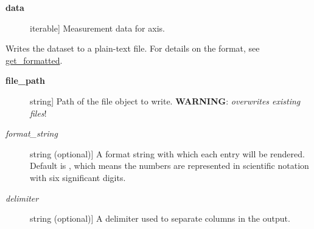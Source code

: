 \documentclass[a4paper,10pt,english]{sphinxmanual}
\begin{document}
\begin{fulllineitems}
\begin{fulllineitems}
\begin{description}
\item[{\textbf{data}}] \leavevmode{[}iterable{]}
Measurement data for axis.

\end{description}

\end{fulllineitems}


\begin{fulllineitems}
\label{index:kafe.dataset.Dataset.write_formatted}
Writes the dataset to a plain-text file. For details on the format, see {\hyperref[index:get-formatted]{get\_formatted}}.
\begin{description}
\item[{\textbf{file\_path}}] \leavevmode{[}string{]}
Path of the file object to write. \textbf{WARNING}: \emph{overwrites existing files}!

\item[{\emph{format\_string}}] \leavevmode{[}string (optional){]}
A format string with which each entry will be rendered. Default is , which means
the numbers are represented in scientific notation with six significant digits.

\item[{\emph{delimiter}}] \leavevmode{[}string (optional){]}
A delimiter used to separate columns in the output.

\end{description}

\end{fulllineitems}


\end{fulllineitems}

\end{document}
